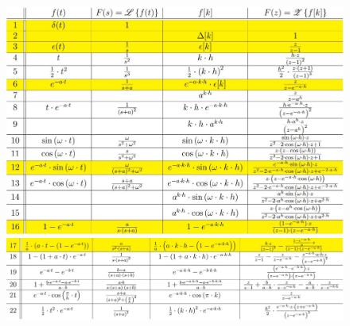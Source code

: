 \begin{figure}[H]
    \includegraphics[width  = 1\textwidth]{img/Tranforme_en_Z.JPG}
    \includegraphics[width  = 1\textwidth]{img/Tranforme_en_Z2.JPG}
\end{figure}